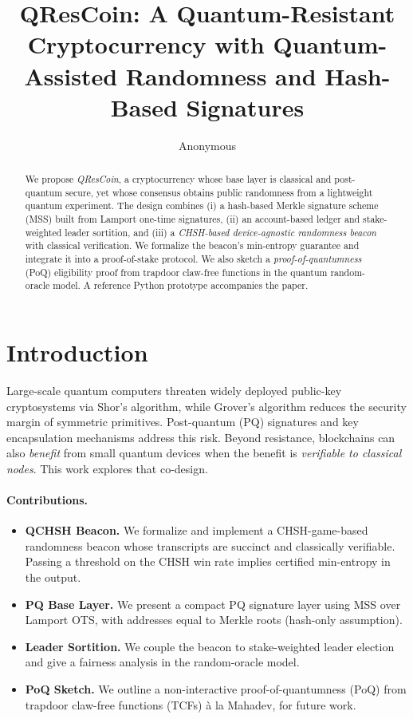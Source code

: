\documentclass[11pt]{article}
\title{\textbf{QResCoin: A Quantum-Resistant Cryptocurrency with Quantum-Assisted Randomness and Hash-Based Signatures}}
\author[1]{Anonymous}
\affil[1]{\small Draft, October 2025. This document is a research proposal with unproven components.}
\date{}
\begin{document}
\maketitle

\begin{abstract}
We propose \emph{QResCoin}, a cryptocurrency whose base layer is classical and post-quantum secure, yet whose consensus obtains public randomness from a lightweight quantum experiment. The design combines (i) a hash-based Merkle signature scheme (MSS) built from Lamport one-time signatures, (ii) an account-based ledger and stake-weighted leader sortition, and (iii) a \emph{CHSH-based device-agnostic randomness beacon} with classical verification. We formalize the beacon's min-entropy guarantee and integrate it into a proof-of-stake protocol. We also sketch a \emph{proof-of-quantumness} (PoQ) eligibility proof from trapdoor claw-free functions in the quantum random-oracle model. A reference Python prototype accompanies the paper.
\end{abstract}

\section{Introduction}
Large-scale quantum computers threaten widely deployed public-key cryptosystems via Shor's algorithm, while Grover's algorithm reduces the security margin of symmetric primitives. Post-quantum (PQ) signatures and key encapsulation mechanisms address this risk. Beyond resistance, blockchains can also \emph{benefit} from small quantum devices when the benefit is \emph{verifiable to classical nodes}. This work explores that co-design.

\paragraph{Contributions.}
\begin{itemize}
  \item \textbf{QCHSH Beacon.} We formalize and implement a CHSH-game-based randomness beacon whose transcripts are succinct and classically verifiable. Passing a threshold on the CHSH win rate implies certified min-entropy in the output.
  \item \textbf{PQ Base Layer.} We present a compact PQ signature layer using MSS over Lamport OTS, with addresses equal to Merkle roots (hash-only assumption).
  \item \textbf{Leader Sortition.} We couple the beacon to stake-weighted leader election and give a fairness analysis in the random-oracle model.
  \item \textbf{PoQ Sketch.} We outline a non-interactive proof-of-quantumness (PoQ) from trapdoor claw-free functions (TCFs) à la Mahadev, for future work.
\end{itemize}
\end{document}

